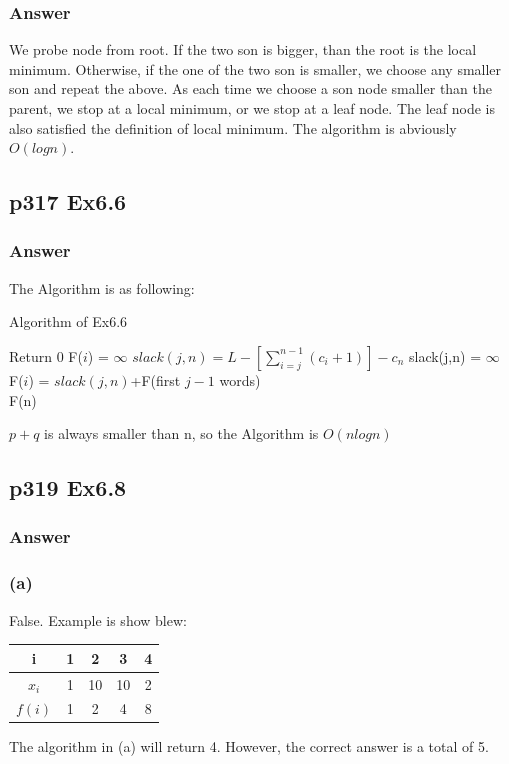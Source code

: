 \documentclass[a4paper]{article}
\begin{document}
\subsubsection*{Answer}
We probe node from root. If the two son is bigger, than the root is the local minimum. Otherwise, if the one of the two son is smaller, we choose any smaller son and repeat the above. As each time we choose a son node smaller than the parent, we stop at a local minimum, or we stop at a leaf node. The leaf node is also satisfied the definition of local minimum. The algorithm is abviously $O(logn)$.
\vspace{2cm}


\subsection*{p317 Ex6.6}
\subsubsection*{Answer}
The Algorithm is as following:
\begin{algorithm}[!htb]
	\caption{Algorithm of Ex6.6}
	\begin{algorithmic}[1]
		\State Return{ 0}
		\Else
		\State F($i$) = $\infty$
		\State $slack(j,n) = L-\left[\sum_{i=j}^{n-1}\left(c_{i}+1\right)\right]-c_{n}$
		\Else
		\State slack(j,n) = $\infty$
		\EndIf
		\State F($i$) = $slack(j,n)$+F(first $j-1$ words)
		\EndIf
		\EndFor
		\EndFor
		\EndIf \\
		\Return F(n)
		\EndFunction
	\end{algorithmic}
\end{algorithm}
\par $p+q$ is always smaller than n, so the Algorithm is $O(nlogn)$
\vspace{2cm}



\subsection*{p319 Ex6.8}
\subsubsection*{Answer}
\subsubsection*{(a)}
False. Example is show blew:
\begin{center}
	\begin{tabular}{ccccc}
		\hline
		i      & 1 & 2  & 3  & 4 \\
		\hline
		$x_i$  & 1 & 10 & 10 & 2 \\
		\hline
		$f(i)$ & 1 & 2  & 4  & 8 \\
		\hline
	\end{tabular}
\end{center}
\par The algorithm in (a) will return 4. However, the correct answer is a total of 5.
\end{document}
